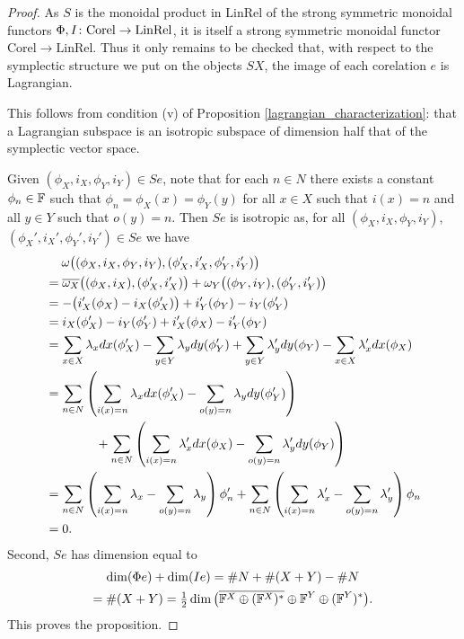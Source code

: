 \begin{proof}
  As $S$ is the monoidal product in $\mathrm{LinRel}$ of the strong symmetric
  monoidal functors $\Phi, I{\colon} \mathrm{Corel} \to \mathrm{LinRel}$, it is
  itself a strong symmetric monoidal functor $\mathrm{Corel} \to
  \mathrm{LinRel}$. Thus it only remains to be checked that, with respect to the
  symplectic structure we put on the objects $SX$, the image of each
  corelation $e$ is Lagrangian. 

  
  This follows from condition (v) of Proposition
  \ref{lagrangian_characterization}: that a Lagrangian subspace is an isotropic
  subspace of dimension half that of the symplectic vector space.

  Given $(\phi_X,i_X,\phi_Y,i_Y) \in Se$, note that for each $n \in N$ there
  exists a constant $\phi_n \in {\mathbb F}$ such that $\phi_n=\phi_X(x) = \phi_Y(y)$ for
  all $x \in X$ such that $i(x) = n$ and all $y \in Y$ such that $o(y)= n$. 
  Then $Se$ is isotropic as, for all 
  $(\phi_X,i_X,\phi_Y,i_Y)$, $(\phi_X',i_X',\phi_Y',i_Y') \in Se$ we have
  \begin{align*}
    &\phantom{=} \enskip
    \omega\big((\phi_X,i_X,\phi_Y,i_Y),(\phi_X',i_X',\phi_Y',i_Y')\big)
    \\
    &= \overline{\omega_X}\big((\phi_X,i_X),(\phi_X',i_X')\big) +
    \omega_Y\big((\phi_Y,i_Y),(\phi_Y',i_Y')\big) \\
    &= -\big(i_X'(\phi_X)-i_X(\phi_X')\big) + i_Y'(\phi_Y)-i_Y(\phi_Y') \\
    &= i_X(\phi_X')-i_Y(\phi_Y') + i_X'(\phi_X)-i_Y'(\phi_Y) \\
    &= \sum_{x \in X} \lambda_x dx(\phi_X') - \sum_{y \in Y} \lambda_y dy(\phi_Y') +
    \sum_{y \in Y} \lambda_y' dy(\phi_Y) - \sum_{x \in X} \lambda_x' dx(\phi_X)\\
    &= \sum_{n \in N}\left(\sum_{i(x)=n} \lambda_x dx(\phi_X') -
    \sum_{o(y)=n} \lambda_y dy(\phi_Y')\right) \\
    &\qquad \qquad+ \sum_{n \in N}\left(\sum_{i(x)=n} \lambda_x'dx(\phi_X) -
    \sum_{o(y)=n} \lambda_y' dy(\phi_Y)\right)\\
    &= \sum_{n \in N}\left(\sum_{i(x)=n} \lambda_x - \sum_{o(y)=n} \lambda_y
    \right)\phi'_n + \sum_{n \in N}\left(\sum_{i(x)=n} \lambda_x'- \sum_{o(y)=n}
    \lambda_y'\right)\phi_n\\
    &= 0.
  \end{align*}
  Second, $Se$ has dimension equal to 
  \begin{multline*}
    \dim(\Phi e)+ \dim(Ie) = \#N+\#(X+Y) - \#N \\
    = \#(X+Y) = \tfrac12
    \dim\big(\overline{{\mathbb F}^X \oplus ({\mathbb F}^X)^\ast} \oplus {\mathbb F}^Y \oplus
    ({\mathbb F}^Y)^\ast\big).
  \end{multline*}
  This proves the proposition.
\end{proof}

